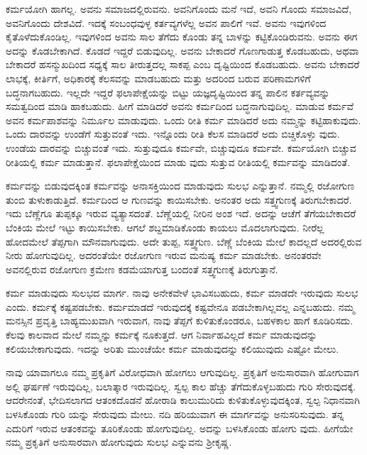 ಕರ್ಮಯೋಗಿ ಹಾಗಲ್ಲ. ಅವನು ಸಮಾಜದಲ್ಲಿರುವನು. ಅವನಿಗೊಂದು ಮನೆ ಇದೆ, ಅವನಿ ಗೊಂದು ಸಮಾಜವಿದೆ, ಅವನಿಗೊಂದು ದೇಶವಿದೆ. ಇದಕ್ಕೆ ಸಂಬಂಧವುಳ್ಳ ಕರ್ತವ್ಯಗಳೆಲ್ಲ ಅವನ ಪಾಲಿಗೆ ಇವೆ. ಅವನು ಇವುಗಳಿಂದ ಕೈತೊಳೆದುಕೊಂಡಿಲ್ಲ. ಇವುಗಳಿಂದ ಅವನು ಸಾಲ ತೆಗೆದು ಕೊಂಡು ತನ್ನ ಬಾಳನ್ನು ಕಟ್ಟಿಕೊಂಡಿರುವನು. ಅವನು ಈಗ ಅದನ್ನು ಕೊಡಬೇಕಾಗಿದೆ. ಕೊಡದೆ ಇದ್ದರೆ ಬಿಡುವುದಿಲ್ಲ. ಅವನು ಬೇಕಾದರೆ ಗೊಣಗಾಡುತ್ತ ಕೊಡಬಹುದು, ಅಥವಾ ಬೇಕಾದರೆ ಹಸನ್ಮುಖದಿಂದ ಸಧ್ಯಕ್ಕೆ ಸಾಲ ತೀರುತ್ತದಲ್ಲ ಸಾಕಪ್ಪ ಎಂಬ ದೃಷ್ಟಿಯಿಂದ ಕೊಡಬಹುದು. ಅವನು ಬೇಕಾದರೆ ಲಾಭಕ್ಕೆ, ಕೀರ್ತಿಗೆ, ಅಧಿಕಾರಕ್ಕೆ ಕೆಲಸವನ್ನು ಮಾಡಬಹುದು ಮತ್ತು ಅದರಿಂದ ಬರುವ ಪರಿಣಾಮಗಳಿಗೆ ಬದ್ಧನಾಗಬಹುದು. ಇಲ್ಲದೇ ಇದ್ದರೆ ಫಲಾಪೇಕ್ಷೆಯನ್ನು ಬಿಟ್ಟು ಯಜ್ಞದೃಷ್ಟಿಯಿಂದ ತನ್ನ ಪಾಲಿನ ಕರ್ತವ್ಯವನ್ನು ಸಮತ್ವದಿಂದ ಮಾಡಿ ಹಾಕಬಹುದು. ಹೀಗೆ ಮಾಡಿದರೆ ಅವನು ಕರ್ಮದಿಂದ ಬದ್ಧನಾಗುವುದಿಲ್ಲ. ಮಾಡುವ ಕರ್ಮವೆ ಅವನ ಕರ್ಮಪಾಶವನ್ನು ನಿರ್ಮೂಲ ಮಾಡುವುದು. ಒಂದು ರೀತಿ ಕರ್ಮ ಮಾಡಿದರೆ ಅದು ನಮ್ಮನ್ನು ಕಟ್ಟಿಹಾಕುವುದು. ಒಂದು ದಾರವನ್ನು ಉಂಡೆಗೆ ಸುತ್ತುವಂತೆ ಇದು. ಇನ್ನೊಂದು ರೀತಿ ಕೆಲಸ ಮಾಡಿದರೆ ಅದು ಬಿಚ್ಚಿಕೊಳ್ಳು ವುದು. ಉಂಡೆಯ ದಾರವನ್ನು ಬಿಚ್ಚುವಂತೆ ಇದು. ಸುತ್ತುವುದೂ ಕರ್ಮವೇ, ಬಿಚ್ಚುವುದೂ ಕರ್ಮವೇ. ಕರ್ಮಯೋಗಿ ಬಿಚ್ಚುವ ರೀತಿಯಲ್ಲಿ ಕರ್ಮ ಮಾಡುತ್ತಾನೆ. ಫಲಾಪೇಕ್ಷೆಯಿಂದ ಮಾಡು ವುದು ಸುತ್ತುವ ರೀತಿಯಲ್ಲಿ ಕರ್ಮವನ್ನು ಮಾಡಿದಂತೆ.

ಕರ್ಮವನ್ನು ಬಿಡುವುದಕ್ಕಿಂತ ಕರ್ಮವನ್ನು ಅನಾಸಕ್ತಿಯಿಂದ ಮಾಡುವುದು ಸುಲಭ ಎನ್ನುತ್ತಾನೆ. ನಮ್ಮಲ್ಲಿ ರಜೋಗುಣ ತುಂಬಿ ತುಳುಕಾಡುತ್ತಿದೆ. ಕರ್ಮದಿಂದ ಆ ಗುಣವನ್ನು ಕಾಯಿಸಬೇಕು. ಅನಂತರ ಅದು ಸತ್ತ್ವಗುಣಕ್ಕೆ ತಿರುಗಬೇಕಾದರೆ. ಇದು ಬೆಣ್ಣೆಗೂ ತುಪ್ಪಕ್ಕೂ ಇರುವ ವ್ಯತ್ಯಾಸದಂತೆ. ಬೆಣ್ಣೆಯಲ್ಲಿ ನೀರಿನ ಅಂಶ ಇದೆ. ಅದನ್ನು ಆಚೆಗೆ ತೆಗೆಯಬೇಕಾದರೆ ಬೆಂಕಿಯ ಮೇಲೆ ಇಟ್ಟು ಕಾಯಿಸಬೇಕು. ಆಗಲೆ ಶಬ್ದಮಾಡಿಕೊಂಡು ಕಾಯಲು ಮೊದಲಾಗುವುದು. ನೀರೆಲ್ಲ ಹೋದಮೇಲೆ ತೆಪ್ಪಗಾಗಿ ಮೌನವಾಗುವುದು. ಅದೇ ತುಪ್ಪ, ಸತ್ತ್ವಗುಣ. ಬೆಣ್ಣೆ ಬೆಂಕಿಯ ಮೇಲೆ ಕಾದಲ್ಲದೆ ಅದರಲ್ಲಿರುವ ನೀರು ಹೋಗುವುದಿಲ್ಲ. ಅದರಂತೆಯೇ ರಜೋಗುಣ ಇರುವ ಮನುಷ್ಯ ಕರ್ಮ ಮಾಡಬೇಕು. ಅನಂತರವೇ ಅವನಲ್ಲಿರುವ ರಜೋಗುಣ ಕ್ರಮೇಣ ಕಡಮೆಯಾಗುತ್ತ ಬಂದಂತೆ ಸತ್ತ್ವಗುಣಕ್ಕೆ ತಿರುಗುತ್ತಾನೆ.

ಕರ್ಮ ಮಾಡುವುದು ಸುಲಭದ ಮಾರ್ಗ. ನಾವು ಅನೇಕವೇಳೆ ಭಾವಿಸಬಹುದು, ಕರ್ಮ ಮಾಡದೇ ಇರುವುದು ಸುಲಭ ಎಂದು. ಕರ್ಮಕ್ಕೆ ಕಷ್ಟಪಡಬೇಕು. ಕರ್ಮಮಾಡದೆ ಇರುವುದಕ್ಕೆ ಕಷ್ಟವೇನೂ ಪಡಬೇಕಾಗಿಲ್ಲವಲ್ಲ ಎನ್ನಬಹುದು. ನಮ್ಮ ಮನಸ್ಸಿನ ಪ್ರವೃತ್ತಿ ಬಾಹ್ಯಮುಖವಾಗಿ ಇರುವಾಗ, ನಾವು ತೆಪ್ಪಗೆ ಕುಳಿತುಕೊಂಡರೂ, ಬಹಳಕಾಲ ಹಾಗೆ ಕೂಡಿರಿಸದು. ಕೆಲವು ಕಾಲವಾದ ಮೇಲೆ ನಮ್ಮನ್ನು ಕರ್ಮಕ್ಕೆ ನೂಕುತ್ತದೆ. ಆಗ ನಿರ್ವಾಹವಿಲ್ಲದೆ ಕರ್ಮ ಮಾಡುವುದನ್ನು ಕಲಿಯಬೇಕಾಗುವುದು. ಇದನ್ನು ಅರಿತು ಮುಂಚೆಯೇ ಕರ್ಮ ಮಾಡುವುದನ್ನು ಕಲಿಯುವುದು ಎಷ್ಟೋ ಮೇಲು.

ನಾವು ಯಾವಾಗಲೂ ನಮ್ಮ ಪ್ರಕೃತಿಗೆ ವಿರೋಧವಾಗಿ ಹೋಗಲು ಆಗುವುದಿಲ್ಲ. ಪ್ರಕೃತಿಗೆ ಅನುಸಾರವಾಗಿ ಹೋಗುವಾಗ ಅಲ್ಲಿ ಘರ್ಷಣೆ ಇರುವುದಿಲ್ಲ, ಬಲಾತ್ಕಾರ ಇರುವುದಿಲ್ಲ. ಸ್ವಲ್ಪ ಕಾಲ ಹೆಚ್ಚು ತೆಗೆದುಕೊಳ್ಳಬಹುದು ಗುರಿ ಸೇರುವುದಕ್ಕೆ. ಆದರೇನಂತೆ, ಭೇದಿಸಲಾಗದ ಆತಂಕದೊಡನೆ ಹೋರಾಡಿ ಕಾಲುಮುರಿದು ಕುಳಿತುಕೊಳ್ಳುವುದಕ್ಕಿಂತ, ಸ್ವಲ್ಪ ನಿಧಾನವಾಗಿ ಬಳಸಿಕೊಂಡು ಗುರಿ ಯನ್ನು ಸೇರುವುದು ಮೇಲು. ನದಿ ಹರಿಯುವಾಗ ಈ ಮಾರ್ಗವನ್ನು ಅನುಸರಿಸುವುದು. ತನ್ನ ಎದುರಿಗೆ ಇರುವ ಆತಂಕವನ್ನು ತೂರಿಕೊಂಡು ಹೋಗುವುದಿಲ್ಲ. ಅದನ್ನು ಬಳಸಿಕೊಂಡು ಹೋಗು ವುದು. ಹೀಗೆಯೇ ನಮ್ಮ ಪ್ರಕೃತಿಗೆ ಅನುಸಾರವಾಗಿ ಹೋಗುವುದು ಸುಲಭ ಎನ್ನುವನು ಶ್ರೀಕೃಷ್ಣ.

